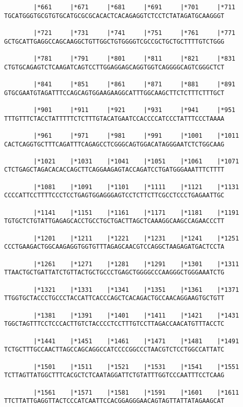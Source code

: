 \documentclass{article}
\begin{document}
\begin{Verbatim}
        |*661     |*671     |*681     |*691     |*701     |*711
TGCATGGGTGCGTGTGCATGCGCGCACACTCACAGAGGTCTCCTCTATAGATGCAAGGGT
  
        |*721     |*731     |*741     |*751     |*761     |*771
GCTGCATTGAGGCCAGCAAGGCTGTTGGCTGTGGGGTCGCCGCTGCTGCTTTTGTCTGGG
  
        |*781     |*791     |*801     |*811     |*821     |*831
CTGTGCAGAGTCTCAAGATCAGTCCTTGGAGGAGCAGGTGGTCAGGGGCAGTCGGGCTCT
  
        |*841     |*851     |*861     |*871     |*881     |*891
GTGCGAATGTAGATTTCCAGCAGTGGAAGAAGGCATTTGGCAAGCTTCTCTTTCTTTGCT
  
        |*901     |*911     |*921     |*931     |*941     |*951
TTTGTTTCTACCTATTTTTCTCTTTGTACATGAATCCACCCCATCCCTATTTCCCTAAAA
  
        |*961     |*971     |*981     |*991     |*1001    |*1011
CACTCAGGTGCTTTCAGATTTCAGAGCCTCGGGCAGTGGACATAGGGAATCTCTGGCAAG
  
        |*1021    |*1031    |*1041    |*1051    |*1061    |*1071
CTCTGAGCTAGACACACCAGCTTCAGGAAGAGTACCAGATCCTGATGGGAAATTTCTTTT
  
        |*1081    |*1091    |*1101    |*1111    |*1121    |*1131
CCCCATTCCTTTTCCCTCCTGAGTGGAGGGAGTCCTCTTCTTCGCCTCCCTGAGAATTGC
  
        |*1141    |*1151    |*1161    |*1171    |*1181    |*1191
TGTGCTCTGTATTGAGAGCACCTGCCTGCTGACTTAGCTCAAAGGCAAGCCAGAACCCTT
  
        |*1201    |*1211    |*1221    |*1231    |*1241    |*1251
CCCTGAAGACTGGCAAGAGGTGGTGTTTAGAGCAACGTCCAGGCTAAGAGATGACTCCTA
  
        |*1261    |*1271    |*1281    |*1291    |*1301    |*1311
TTAACTGCTGATTATCTGTTACTGCTGCCCTGAGCTGGGGCCCAAGGGCTGGGAAATCTG
  
        |*1321    |*1331    |*1341    |*1351    |*1361    |*1371
TTGGTGCTACCCTGCCCTACCATTCACCCAGCTCACAGACTGCCAACAGGAAGTGCTGTT
  
        |*1381    |*1391    |*1401    |*1411    |*1421    |*1431
TGGCTAGTTTCCTCCCACTTGTCTACCCCTCCTTTGTCCTTAGACCAACATGTTTACCTC
  
        |*1441    |*1451    |*1461    |*1471    |*1481    |*1491
TCTGCTTTGCCAACTTAGCCAGCAGGCCATCCCCGGCCCTAACGTCTCCTGGCCATTATC
  
        |*1501    |*1511    |*1521    |*1531    |*1541    |*1551
TCTTAGTTATGGCTTTCACGCTCTCAATAGGATTCTGTATTTGGTCCCAATTTCCTCAAG
  
        |*1561    |*1571    |*1581    |*1591    |*1601    |*1611
TTCTTATTGAGGTTACTCCCATCAATTCCACGGAGGGAACAGTAGTTATTATAGAAGCAT
  

\end{Verbatim}
\end{document}
